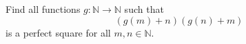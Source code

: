 Find all functions $g:\mathbb{N}\rightarrow\mathbb{N}$ such that \[\left(g(m)+n\right)\left(g(n)+m\right)\] is a perfect square for all $m,n\in\mathbb{N}.$